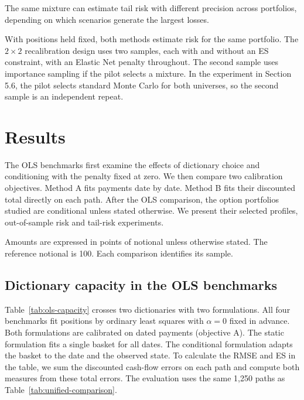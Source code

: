 \documentclass[12pt,a4paper]{article}
\newcommand{\1}{\mathbf{1}}
\begin{document}
The same mixture can estimate tail risk with different precision across portfolios, depending on which scenarios generate the largest losses.

{With positions held fixed, both methods estimate risk for the same portfolio. The $2\times 2$ recalibration design uses two samples, each with and without an ES constraint, with an Elastic Net penalty throughout. The second sample uses importance sampling if the pilot selects a mixture. In the experiment in Section 5.6, the pilot selects standard Monte Carlo for both universes, so the second sample is an independent repeat.}

\section{Results}

The OLS benchmarks first examine the effects of dictionary choice and conditioning with the penalty fixed at zero. We then compare two calibration objectives. Method A fits payments date by date. Method B fits their discounted total directly on each path. After the OLS comparison, the option portfolios studied are conditional unless stated otherwise. We present their selected profiles, out-of-sample risk and tail-risk experiments.

Amounts are expressed in points of notional unless otherwise stated. The reference notional is 100. Each comparison identifies its sample.

\subsection{Dictionary capacity in the OLS benchmarks}

Table~\ref{tab:ols-capacity} crosses two dictionaries with two formulations. All four benchmarks fit positions by ordinary least squares with $\alpha=0$ fixed in advance. Both formulations are calibrated on dated payments (objective A). The static formulation fits a single basket for all dates. The conditional formulation adapts the basket to the date and the observed state. To calculate the RMSE and ES in the table, we sum the discounted cash-flow errors on each path and compute both measures from these total errors. The evaluation uses the same 1,250 paths as Table~\ref{tab:unified-comparison}.
\end{document}
